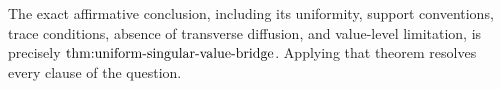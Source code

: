 The exact affirmative conclusion, including its uniformity, support conventions, trace conditions, absence of transverse diffusion, and value-level limitation, is precisely \(\textnormal{thm:uniform-singular-value-bridge}\).  Applying that theorem resolves every clause of the question.
